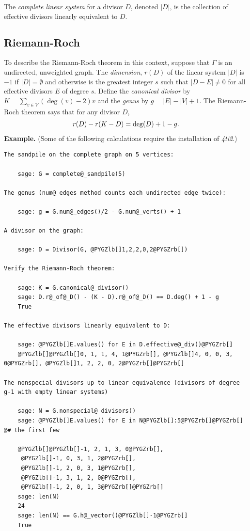 \documentclass[letterpaper,10pt,english]{manual}
\begin{document}
The \emph{complete linear system} for a divisor $D$, denoted $|D|$, is the
collection of effective divisors linearly equivalent to $D.$


\subsection{Riemann-Roch}

To describe the Riemann-Roch theorem in this context, suppose that $\Gamma$ is
an undirected, unweighted graph. The \emph{dimension}, $r(D)$ of the linear system
$|D|$ is $-1$ if $|D|=\emptyset$ and otherwise is the greatest integer $s$ such
that $|D-E|\neq0$ for all effective divisors $E$ of degree $s$.  Define the
\emph{canonical divisor} by $K=\sum_{v\in V}(\deg(v)-2)v$ and the \emph{genus} by $g =
|E| - |V| + 1$.  The Riemann-Roch theorem says that for any divisor $D$,
\begin{gather}
\begin{split}r(D)-r(K-D)=\deg(D)+1-g.\end{split}\notag
\end{gather}
\textbf{Example.} (Some of the following calculations require the installation of \emph{4ti2}.)

\begin{Verbatim}[commandchars=@\[\]]
The sandpile on the complete graph on 5 vertices:

    sage: G = complete@_sandpile(5)

The genus (num@_edges method counts each undirected edge twice):

    sage: g = G.num@_edges()/2 - G.num@_verts() + 1

A divisor on the graph:

    sage: D = Divisor(G, @PYGZlb[]1,2,2,0,2@PYGZrb[])

Verify the Riemann-Roch theorem:

    sage: K = G.canonical@_divisor()
    sage: D.r@_of@_D() - (K - D).r@_of@_D() == D.deg() + 1 - g
    True

The effective divisors linearly equivalent to D:

    sage: @PYGZlb[]E.values() for E in D.effective@_div()@PYGZrb[]
    @PYGZlb[]@PYGZlb[]0, 1, 1, 4, 1@PYGZrb[], @PYGZlb[]4, 0, 0, 3, 0@PYGZrb[], @PYGZlb[]1, 2, 2, 0, 2@PYGZrb[]@PYGZrb[]

The nonspecial divisors up to linear equivalence (divisors of degree
g-1 with empty linear systems)

    sage: N = G.nonspecial@_divisors()
    sage: @PYGZlb[]E.values() for E in N@PYGZlb[]:5@PYGZrb[]@PYGZrb[]   @# the first few

    @PYGZlb[]@PYGZlb[]-1, 2, 1, 3, 0@PYGZrb[],
     @PYGZlb[]-1, 0, 3, 1, 2@PYGZrb[],
     @PYGZlb[]-1, 2, 0, 3, 1@PYGZrb[],
     @PYGZlb[]-1, 3, 1, 2, 0@PYGZrb[],
     @PYGZlb[]-1, 2, 0, 1, 3@PYGZrb[]@PYGZrb[]
    sage: len(N)
    24
    sage: len(N) == G.h@_vector()@PYGZlb[]-1@PYGZrb[]
    True
\end{Verbatim}
\end{document}
